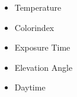 \documentclass[aspectratio=169]{beamer} %
\begin{document}
\begin{frame}
\begin{columns}[T]
\begin{column}{.75\textwidth}
\begin{figure}[htbp]
				\end{figure}
			\end{column}
		\begin{column}{.4\textwidth}
				\begin{itemize}
				\item Temperature
				\item Colorindex
				\item Exposure Time
				\item Elevation Angle
				\item Daytime 	
			\end{itemize}
		\end{column}
	\end{columns}
		\end{frame}
		
		
		
\end{document}
